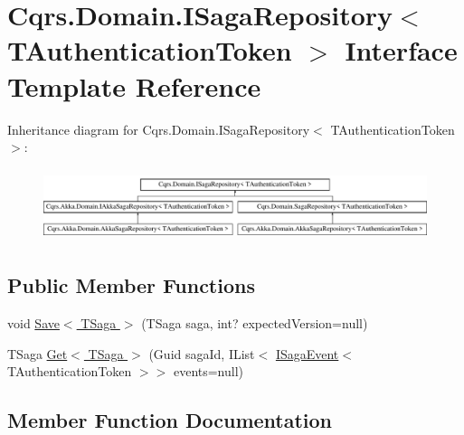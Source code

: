 \hypertarget{interfaceCqrs_1_1Domain_1_1ISagaRepository}{}\section{Cqrs.\+Domain.\+I\+Saga\+Repository$<$ T\+Authentication\+Token $>$ Interface Template Reference}
\label{interfaceCqrs_1_1Domain_1_1ISagaRepository}
Inheritance diagram for Cqrs.\+Domain.\+I\+Saga\+Repository$<$ T\+Authentication\+Token $>$\+:\begin{figure}[H]
\begin{center}
\leavevmode
\includegraphics[height=2.137405cm]{interfaceCqrs_1_1Domain_1_1ISagaRepository}
\end{center}
\end{figure}
\subsection*{Public Member Functions}
\begin{DoxyCompactItemize}
\item 
void \hyperlink{interfaceCqrs_1_1Domain_1_1ISagaRepository_ad539cdc70f3168d0335c9510742e25cd_ad539cdc70f3168d0335c9510742e25cd}{Save$<$ T\+Saga $>$} (T\+Saga saga, int? expected\+Version=null)
\item 
T\+Saga \hyperlink{interfaceCqrs_1_1Domain_1_1ISagaRepository_aa3409bf59bbe489afcc89716928e9ad1_aa3409bf59bbe489afcc89716928e9ad1}{Get$<$ T\+Saga $>$} (Guid saga\+Id, I\+List$<$ \hyperlink{interfaceCqrs_1_1Events_1_1ISagaEvent}{I\+Saga\+Event}$<$ T\+Authentication\+Token $>$$>$ events=null)
\end{DoxyCompactItemize}


\subsection{Member Function Documentation}
\mbox{\label{interfaceCqrs_1_1Domain_1_1ISagaRepository_aa3409bf59bbe489afcc89716928e9ad1_aa3409bf59bbe489afcc89716928e9ad1}} 
